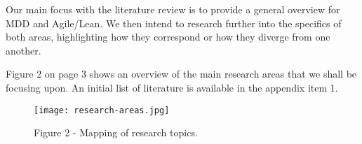 \documentclass[ProjectPlan_innit.tex]{subfiles}
\begin{document}
Our main focus with the literature review is to provide a general overview for MDD and Agile/Lean. We then intend to research further into the specifics of both areas, highlighting how they correspond or how they diverge from one another. 

\hspace{0pt} 
Figure 2 on page 3 shows an overview of the main research areas that we shall be focusing upon. An initial list of literature is available in the appendix item 1.
\hspace{0pt}



\begin{figure*}[H!]
  \texttt{[image: research-areas.jpg]}
  \caption{Figure 2 - Mapping of research topics.}
  \label{BBB}
\end{figure*}
\end{document}
